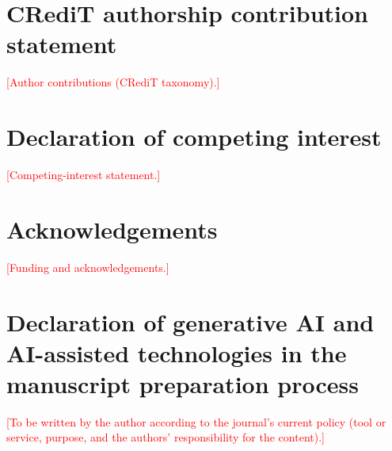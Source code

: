 \section*{CRediT authorship contribution statement}
\textcolor{red}{[Author contributions (CRediT taxonomy).]}

\section*{Declaration of competing interest}
\textcolor{red}{[Competing-interest statement.]}

\section*{Acknowledgements}
\textcolor{red}{[Funding and acknowledgements.]}

\section*{Declaration of generative AI and AI-assisted technologies in the manuscript preparation process}
\textcolor{red}{[To be written by the author according to the journal's current policy (tool or service, purpose, and the
authors' responsibility for the content).]}
